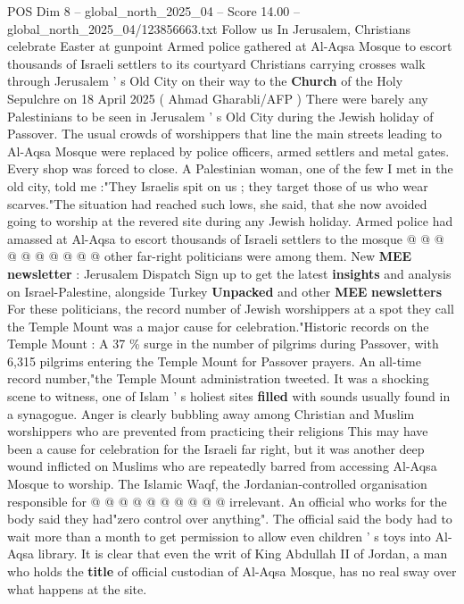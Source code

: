 \begin{textsample}{POS Dim 8 – global\_north\_2025\_04 – Score 14.00 – global\_north\_2025\_04/123856663.txt}  \label{ex:f8_pos_023}
Follow us In Jerusalem, Christians celebrate Easter at gunpoint Armed police gathered at Al-Aqsa Mosque to escort thousands of Israeli settlers to its courtyard Christians carrying crosses walk through Jerusalem ' s Old City on their way to the \textbf{Church} of the Holy Sepulchre on 18 April 2025 ( Ahmad Gharabli/AFP ) There were barely any Palestinians to be seen in Jerusalem ' s Old City during the Jewish holiday of Passover.
The usual crowds of worshippers that line the main streets leading to Al-Aqsa Mosque were replaced by police officers, armed settlers and metal gates.
Every shop was forced to close.
A Palestinian woman, one of the few I met in the old city, told me :"They Israelis spit on us ; they target those of us who wear scarves."The situation had reached such lows, she said, that she now avoided going to worship at the revered site during any Jewish holiday.
Armed police had amassed at Al-Aqsa to escort thousands of Israeli settlers to the mosque @ @ @ @ @ @ @ @ @ @ other far-right politicians were among them.
New \textbf{MEE} \textbf{newsletter} : Jerusalem Dispatch Sign up to get the latest \textbf{insights} and analysis on Israel-Palestine, alongside Turkey \textbf{Unpacked} and other \textbf{MEE} \textbf{newsletters} For these politicians, the record number of Jewish worshippers at a spot they call the Temple Mount was a major cause for celebration."Historic records on the Temple Mount : A 37 \% surge in the number of pilgrims during Passover, with 6,315 pilgrims entering the Temple Mount for Passover prayers.
An all-time record number,"the Temple Mount administration tweeted.
It was a shocking scene to witness, one of Islam ' s holiest sites \textbf{filled} with sounds usually found in a synagogue.
Anger is clearly bubbling away among Christian and Muslim worshippers who are prevented from practicing their religions This may have been a cause for celebration for the Israeli far right, but it was another deep wound inflicted on Muslims who are repeatedly barred from accessing Al-Aqsa Mosque to worship.
The Islamic Waqf, the Jordanian-controlled organisation responsible for @ @ @ @ @ @ @ @ @ @ irrelevant.
An official who works for the body said they had"zero control over anything".
The official said the body had to wait more than a month to get permission to allow even children ' s toys into Al-Aqsa library.
It is clear that even the writ of King Abdullah II of Jordan, a man who holds the \textbf{title} of official custodian of Al-Aqsa Mosque, has no real sway over what happens at the site.

\end{textsample}
